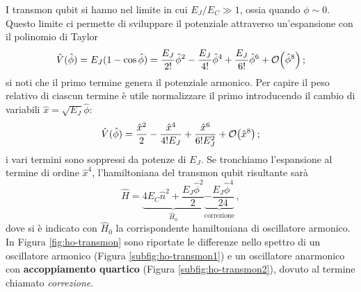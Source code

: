 \noindent I transmon qubit si hanno nel limite in cui $E_J/E_C \gg 1$, ossia quando $\phi \sim 0$. Questo limite ci permette di sviluppare il potenziale attraverso un'espansione con il polinomio di Taylor
\begin{equation*}
    \hat V(\hat \phi)=E_J(1-\cos\hat \phi)=\frac{E_J}{2!}\hat \phi^2-\frac{E_J}{4!}\hat \phi^4 + \frac{E_J}{6!}\hat \phi^6 + \order{\hat\phi^8} \, ;
\end{equation*}
si noti che il primo termine genera il potenziale armonico. Per capire il peso relativo di ciascun termine è utile normalizzare il primo introducendo il cambio di variabili $\hat x=\sqrt{E_J}\hat \phi$:
\begin{equation*}
    \hat V(\hat \phi)= \frac{\hat x^2}{2}-\frac{\hat x^4}{4!E_J}+\frac{\hat x^6}{6!E_J^2} + \order{\hat{x}^8} \, ;
\end{equation*}
i vari termini sono soppressi da potenze di $E_J$. Se tronchiamo l'espansione al termine di ordine $\hat{x}^4$, l'hamiltoniana del transmon qubit risultante sarà
\begin{equation}\label{eq:ham-transmon}
    \hat H = \underbrace{4E_C\hat n^2 + \frac{E_J\hat \phi^2}{2}}_{\hat H_0}\underbrace{-\frac{E_J\hat\phi^4}{24}}_{\text{correzione}} \, ,
\end{equation}
dove si è indicato con $\hat{H}_0$ la corrispondente hamiltoniana di oscillatore armonico. In Figura \ref{fig:ho-transmon} sono riportate le differenze nello spettro di un oscillatore armonico (Figura \ref{subfig:ho-transmon1}) e un oscillatore anarmonico con \textbf{accoppiamento quartico} (Figura \ref{subfig:ho-transmon2}), dovuto al termine chiamato \textit{correzione}.

